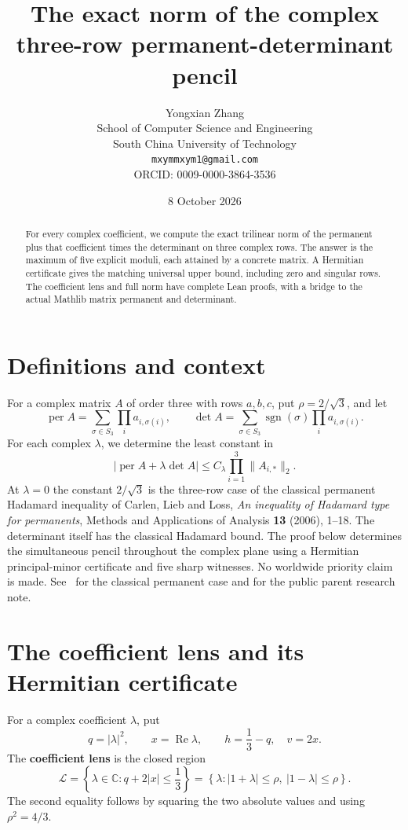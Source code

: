 \documentclass[11pt]{article}
\title{The exact norm of the complex three-row permanent-determinant pencil}
\author{Yongxian Zhang\\[2pt]\small School of Computer Science and Engineering\\\small South China University of Technology\\\small\texttt{mxymmxym1@gmail.com}\\\small ORCID: 0009-0000-3864-3536}
\date{8 October 2026}
\begin{document}
\maketitle
\begin{abstract}For every complex coefficient, we compute the exact trilinear norm of the permanent plus that coefficient times the determinant on three complex rows. The answer is the maximum of five explicit moduli, each attained by a concrete matrix. A Hermitian certificate gives the matching universal upper bound, including zero and singular rows. The coefficient lens and full norm have complete Lean proofs, with a bridge to the actual Mathlib matrix permanent and determinant.\end{abstract}
\section{Definitions and context}\label{definitions-and-context}

For a complex matrix \(A\) of order three with rows \(a,b,c\), put \(\rho=2/\sqrt3\), and let
\[
\operatorname{per}A=\sum_{\sigma\in S_3}\prod_i a_{i,\sigma(i)},\qquad
\det A=\sum_{\sigma\in S_3}\operatorname{sgn}(\sigma)\prod_i a_{i,\sigma(i)}.
\]
For each complex \(\lambda\), we determine the least constant in \[
|\operatorname{per}A+\lambda\det A|\le C_\lambda
                       \prod_{i=1}^3\|A_{i,*}\|_2.
\] At \(\lambda=0\) the constant \(2/\sqrt3\) is the three-row case of
the classical permanent Hadamard inequality of Carlen, Lieb and Loss,
\emph{An inequality of Hadamard type for permanents}, Methods and
Applications of Analysis \textbf{13} (2006), 1--18. The determinant
itself has the classical Hadamard bound. The proof below determines the
simultaneous pencil throughout the complex plane using a Hermitian
principal-minor certificate and five sharp witnesses. No worldwide
priority claim is made. See~\cite{CLL} for the classical permanent case and
\cite{Parent} for the public parent research note.

\section{The coefficient lens and its Hermitian
certificate}\label{the-coefficient-lens-and-its-hermitian-certificate}

For a complex coefficient \(\lambda\), put \[
q=|\lambda|^2,\qquad x=\operatorname{Re}\lambda,\qquad
h=\frac13-q,\quad v=2x.
\] The \textbf{coefficient lens} is the closed region \[
\mathcal L=\left\{\lambda\in\mathbb C:q+2|x|\le\frac13\right\}
=\left\{\lambda:|1+\lambda|\le\rho,\ |1-\lambda|\le\rho\right\}.
\tag{2a}
\] The second equality follows by squaring the two absolute values and
using \(\rho^2=4/3\).
\end{document}
